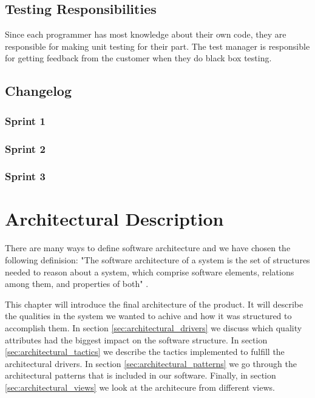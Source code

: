 \documentclass{report}
\begin{document}
\section{Testing Responsibilities} \label{sec:testing_responsibilities}
Since each programmer has most knowledge about their own code, they are responsible for making unit testing for their part. The test manager is responsible for getting feedback from the customer when they do black box testing.

\section{Changelog} \label{sec:changelog}
\subsection{Sprint 1} \label{subsec:sprint_1}
\subsection{Sprint 2} \label{subsec:sprint_2}
\subsection{Sprint 3} \label{subsec:sprint_3}








\chapter{Architectural Description} \label{cha:architectural_description}
There are many ways to define software architecture and we have chosen the following definision: "The software architecture of a system is the set of structures needed to reason about a system, which comprise software elements, relations among them, and properties of both" \cite[page 4]{book:bass}.

This chapter will introduce the final architecture of the product. It will describe the qualities in the system we wanted to achive and how it was structured to accomplish them. In section \ref{sec:architectural_drivers} we discuss which quality attributes had the biggest impact on the software structure. In section \ref{sec:architectural_tactics} we describe the tactics implemented to fulfill the architectural drivers. In section \ref{sec:architectural_patterns} we go through the architectural patterns that is included in our software. Finally, in section \ref{sec:architectural_views} we look at the architecure from different views.
\end{document}
